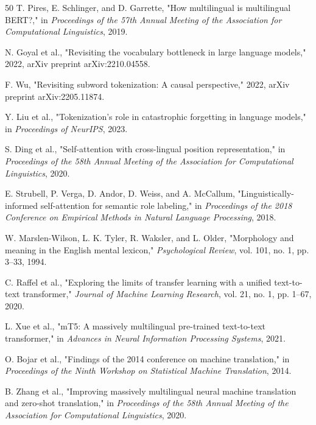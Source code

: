 \documentclass[conference]{IEEEtran}
\begin{document}
\begin{thebibliography}{50}
T. Pires, E. Schlinger, and D. Garrette, "How multilingual is multilingual BERT?," in \textit{Proceedings of the 57th Annual Meeting of the Association for Computational Linguistics}, 2019.

N. Goyal et al., "Revisiting the vocabulary bottleneck in large language models," 2022, arXiv preprint arXiv:2210.04558.

F. Wu, "Revisiting subword tokenization: A causal perspective," 2022, arXiv preprint arXiv:2205.11874.

Y. Liu et al., "Tokenization's role in catastrophic forgetting in language models," in \textit{Proceedings of NeurIPS}, 2023.

S. Ding et al., "Self-attention with cross-lingual position representation," in \textit{Proceedings of the 58th Annual Meeting of the Association for Computational Linguistics}, 2020.

E. Strubell, P. Verga, D. Andor, D. Weiss, and A. McCallum, "Linguistically-informed self-attention for semantic role labeling," in \textit{Proceedings of the 2018 Conference on Empirical Methods in Natural Language Processing}, 2018.

W. Marslen-Wilson, L. K. Tyler, R. Waksler, and L. Older, "Morphology and meaning in the English mental lexicon," \textit{Psychological Review}, vol. 101, no. 1, pp. 3–33, 1994.

C. Raffel et al., "Exploring the limits of transfer learning with a unified text-to-text transformer," \textit{Journal of Machine Learning Research}, vol. 21, no. 1, pp. 1–67, 2020.

L. Xue et al., "mT5: A massively multilingual pre-trained text-to-text transformer," in \textit{Advances in Neural Information Processing Systems}, 2021.

O. Bojar et al., "Findings of the 2014 conference on machine translation," in \textit{Proceedings of the Ninth Workshop on Statistical Machine Translation}, 2014.

B. Zhang et al., "Improving massively multilingual neural machine translation and zero-shot translation," in \textit{Proceedings of the 58th Annual Meeting of the Association for Computational Linguistics}, 2020.


\end{thebibliography}
\end{document}
